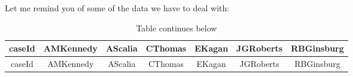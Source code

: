 \documentclass[12pt,twoside]{article}
\begin{document}
Let me remind you of some of the data we have to deal with:

\begin{longtable}[c]{@{}ccccccc@{}}
\caption{Table continues below}\tabularnewline
\toprule
\begin{minipage}[b]{0.10\columnwidth}\centering\strut
caseId
\strut\end{minipage} &
\begin{minipage}[b]{0.13\columnwidth}\centering\strut
AMKennedy
\strut\end{minipage} &
\begin{minipage}[b]{0.11\columnwidth}\centering\strut
AScalia
\strut\end{minipage} &
\begin{minipage}[b]{0.11\columnwidth}\centering\strut
CThomas
\strut\end{minipage} &
\begin{minipage}[b]{0.10\columnwidth}\centering\strut
EKagan
\strut\end{minipage} &
\begin{minipage}[b]{0.13\columnwidth}\centering\strut
JGRoberts
\strut\end{minipage} &
\begin{minipage}[b]{0.13\columnwidth}\centering\strut
RBGinsburg
\strut\end{minipage}\tabularnewline
\midrule
\endfirsthead
\toprule
\begin{minipage}[b]{0.10\columnwidth}\centering\strut
caseId
\strut\end{minipage} &
\begin{minipage}[b]{0.13\columnwidth}\centering\strut
AMKennedy
\strut\end{minipage} &
\begin{minipage}[b]{0.11\columnwidth}\centering\strut
AScalia
\strut\end{minipage} &
\begin{minipage}[b]{0.11\columnwidth}\centering\strut
CThomas
\strut\end{minipage} &
\begin{minipage}[b]{0.10\columnwidth}\centering\strut
EKagan
\strut\end{minipage} &
\begin{minipage}[b]{0.13\columnwidth}\centering\strut
JGRoberts
\strut\end{minipage} &
\begin{minipage}[b]{0.13\columnwidth}\centering\strut
RBGinsburg
\strut\end{minipage}\tabularnewline

\end{longtable}
\end{document}
